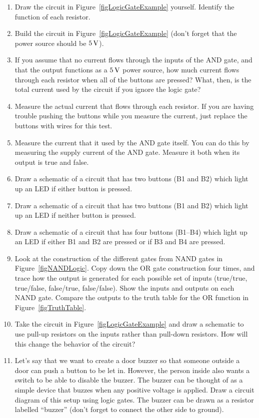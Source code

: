 \applysection

\begin{enumerate}
\item Draw the circuit in Figure~\ref{figLogicGateExample} yourself.  Identify the function of each resistor.
\item Build the circuit in Figure~\ref{figLogicGateExample} (don't forget that the power source should be $5\,\si{\volt}$).
\item If you assume that no current flows through the inputs of the AND gate, and that the output functions as a $5\,\si{\volt}$ power source, how much current flows through each resistor when all of the buttons are pressed?  What, then, is the total current used by the circuit if you ignore the logic gate?
\item Measure the actual current that flows through each resistor.  If you are having trouble pushing the buttons while you measure the current, just replace the buttons with wires for this test.
\item Measure the current that it used by the AND gate itself.  You can do this by measuring the supply current of the AND gate.  Measure it both when its output is true and false.
\item Draw a schematic of a circuit that has two buttons (B1 and B2) which light up an LED if either button is pressed.
\item Draw a schematic of a circuit that has two buttons (B1 and B2) which light up an LED if neither button is pressed.
\item Draw a schematic of a circuit that has four buttons (B1--B4) which light up an LED if either B1 and B2 are pressed or if B3 and B4 are pressed.
\item Look at the construction of the different gates from NAND gates in Figure~\ref{figNANDLogic}.  Copy down the OR gate construction four times, and trace how the output is generated for each possible set of inputs (true/true, true/false, false/true, false/false).  Show the inputs and outputs on each NAND gate.  Compare the outputs to the truth table for the OR function in Figure~\ref{figTruthTable}.
\item Take the circuit in Figure~\ref{figLogicGateExample} and draw a schematic to use pull-up resistors on the inputs rather than pull-down resistors.  How will this change the behavior of the circuit?
\item Let's say that we want to create a door buzzer so that someone outside a door can push a button to be let in.  However, the person inside also wants a switch to be able to disable the buzzer.  The buzzer can be thought of as a simple device that buzzes when any positive voltage is applied.  Draw a circuit diagram of this setup using logic gates.  The buzzer can be drawn as a resistor labelled ``buzzer'' (don't forget to connect the other side to ground).
\end{enumerate}
